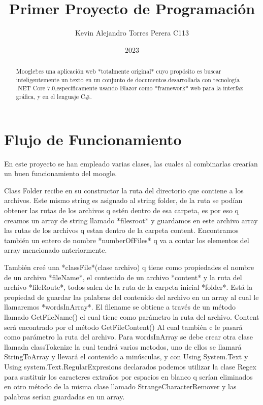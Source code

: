 \documentclass[a4paper,12pt]{article}
\begin{document}
\title{Primer Proyecto de Programación}
\author{Kevin Alejandro Torres Perera C113}
\date{2023}
\maketitle



 \begin{abstract}
 Moogle!:es una aplicación web *totalmente original* cuyo propósito es buscar inteligentemente un texto en un conjunto
de documentos.desarrollada con tecnología .NET Core 7.0,específicamente usando Blazor como *framework* web para la interfaz
gráfica, y en el lenguaje C$\#$.
\end{abstract}



\section{Flujo de Funcionamiento}

En este proyecto se han empleado varias clases, las cuales al combinarlas crearían un buen funcionamiento del moogle.

Class Folder recibe en su constructor la ruta del directorio que contiene a los archivos. Este mismo string es asignado al string folder, de la ruta se podían obtener las rutas de los archivos q estén dentro de esa carpeta, es por eso q creamos un array de string llamado *filesroot* y guardamos en este archivo array las rutas de los archivos q estan dentro de la carpeta content. Encontramos también un entero de nombre *numberOfFiles* q va a contar los elementos del array mencionado anteriormente. 

También creé una *classFile*(clase archivo) q tiene como propiedades el nombre de un archivo *fileName*, el contenido de un archivo *content* y la ruta del archivo *fileRoute*, todos salen de la ruta de la carpeta inicial *folder*. Está la propiedad de guardar las palabras del contenido del archivo en un array al cual le llamaremos *wordsInArray*. El filename se obtiene a través de un método llamado GetFileName() el cual tiene como parámetro la ruta del archivo. Content será encontrado por el método GetFileContent() Al cual también c le pasará como parámetro la ruta del archivo. Para wordsInArray se debe crear otra clase llamada classTokenize la cual tendrá varios metodos, uno de ellos se llamará StringToArray y llevará el contenido a minúsculas, y con Using System.Text y Using system.Text.RegularExpresions declarados podemos utilizar la clase Regex para sustituir los caracteres extraños por espacios en blanco q serían eliminados en otro método de la misma clase llamado StrangeCharacterRemover y las palabras serían guardadas en un array.
\end{document}
